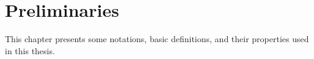 \documentclass[../main]{subfiles}
\begin{document}
\chapter{Preliminaries} 
This chapter presents some notations, basic definitions, and their properties used in this thesis.




















\end{document}
